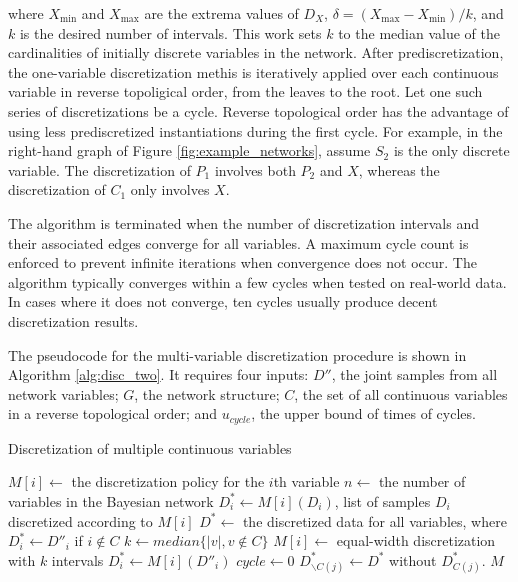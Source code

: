 \noindent
where $X_\text{min}$ and $X_\text{max}$ are the extrema values of $D_X$, $\delta = (X_\text{max} - X_\text{min})/k$, and $k$ is the desired number of intervals.
This work sets $k$ to the median value of the cardinalities of initially discrete variables in the network.
After prediscretization, the one-variable discretization methis is iteratively applied over each continuous variable in reverse topoligical order, from the leaves to the root.
Let one such series of discretizations be a cycle.
Reverse topological order has the advantage of using less prediscretized instantiations during the first cycle.
For example, in the right-hand graph of Figure \ref{fig:example_networks}, assume $S_2$ is the only discrete variable.
The discretization of $P_1$ involves both $P_2$ and $X$, whereas the discretization of $C_1$ only involves $X$.

The algorithm is terminated when the number of discretization intervals and their associated edges converge for all variables.
A maximum cycle count is enforced to prevent infinite iterations when convergence does not occur.
The algorithm typically converges within a few cycles when tested on real-world data.
In cases where it does not converge, ten cycles usually produce decent discretization results.

The pseudocode for the multi-variable discretization procedure is shown in Algorithm \ref{alg:disc_two}.
It requires four inputs: $D''$, the joint samples from all network variables; $G$, the network structure; $C$, the set of all continuous variables in a reverse topological order; and $u_{cycle}$, the upper bound of times of cycles.

\begin{algorithm}
\label{alg:disc_two}
\caption{Discretization of multiple continuous variables }
\begin{algorithmic}[5]
\State
\State $M[i] \leftarrow$ the discretization policy for the $i$th variable
\State $n \leftarrow$ the number of variables in the Bayesian network
\State $D^*_i \leftarrow M[i] (D_i)$, list of samples $D_i$ discretized according to $M[i]$
\State $D^* \leftarrow $ the discretized data for all variables, where $D^*_i \leftarrow D''_i$ if $i \notin C$
\State $k \leftarrow median\{ |v|, v\notin C\}$
\State
{}
\State $M[i] \leftarrow$  equal-width discretization with $k$ intervals
\State $D^*_i \leftarrow  M[i] (D''_i)$
\EndIf
\EndFor
\State
\State $cycle \leftarrow 0$
\State $D^*_{\backslash C(j)} \leftarrow D^*$ without $D^*_{C(j)}$.
\EndFor
\EndWhile
\State \Return $M$
\EndFunction
\end{algorithmic}
\end{algorithm}

